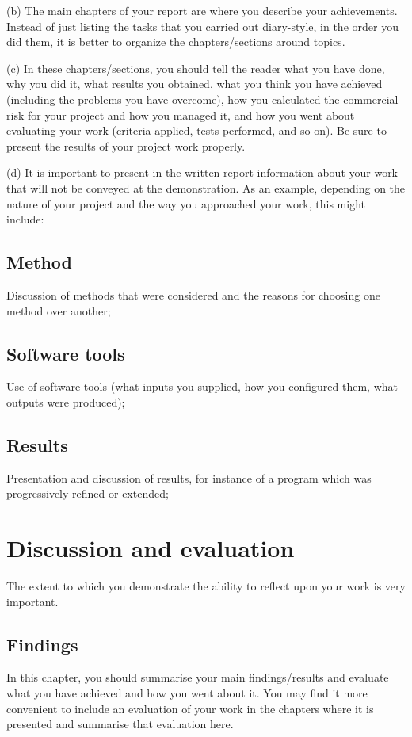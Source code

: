 \documentclass[a4paper, notitlepage, 11pt]{article}
\begin{document}
(b) The main  chapters of your report are where you describe your achievements. Instead of just listing the tasks that you carried out diary-style, in the order you did them, it is better to organize the chapters/sections around topics.  

(c) In  these  chapters/sections,  you  should  tell  the  reader  what  you  have  done,  why  you  did  it,  what results  you  obtained,  what  you  think  you  have  achieved  (including  the  problems  you  have overcome), how you calculated the commercial risk for your project and how you managed it, and how you went about evaluating your work (criteria applied, tests performed, and so on). Be sure to present the results of your project work properly.  

(d) It is important to present in the written report information about your work that will not be conveyed at the demonstration. As an example, depending on the nature of your project and the way you approached your work, this might include:  
\subsection{Method}
Discussion of methods that were considered and the reasons for choosing one method 
over another;  
\subsection{Software tools}
 Use  of  software  tools  (what  inputs  you  supplied,  how  you  configured  them,  what 
outputs were produced);  

\subsection{Results}
Presentation  and  discussion  of  results,  for  instance  of  a  program  which 
was progressively refined or extended; 


\section{Discussion and evaluation}

The extent to which you demonstrate the ability to reflect upon your work is very important. 
\subsection{Findings}
In this chapter, you should summarise your main findings/results and evaluate what you have 
achieved and how you went about it. You may find it more convenient to include an evaluation 
of your work in the chapters where it is presented and summarise that evaluation here. 
\end{document}
